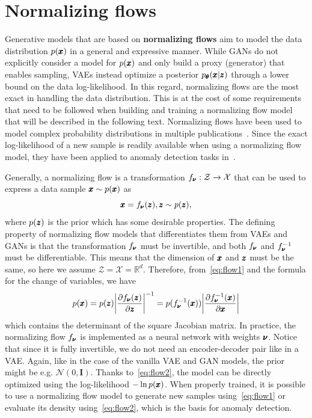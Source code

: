 \section{Normalizing flows} \label{sec:flow_models}
Generative models that are based on \textbf{normalizing flows} aim to model the data distribution $p(\pmb{{x}})$ in a general and expressive manner. While GANs do not explicitly consider a model for $p(\pmb{{x}})$ and only build a proxy (generator) that enables sampling, VAEs instead optimize a posterior $p_{\pmb{{\theta}}}(\pmb{{x}}|\pmb{{z}})$ through a lower bound on the data log-likelihood. In this regard, normalizing flows are the most exact in handling the data distribution. This is at the cost of some requirements that need to be followed when building and training a normalizing flow model that will be described in the following text. Normalizing flows have been used to model complex probability distributions in multiple publications~\cite{dinh2014nice,rezende2015variational,kingma2016improved,jin2022pfvae}. Since the exact log-likelihood of a new sample is readily available when using a normalizing flow model, they have been applied to anomaly detection tasks in~\cite{yamaguchi2019adaflow, schmidtNormalizingFlowsNovelty2019, diasAnomalyDetectionTrajectory2020a, pevny2020sum,rudolph2022fully}.

Generally, a normalizing flow is a transformation $f_{\pmb{{\nu}}}:\mathcal{Z} \rightarrow \mathcal{X}$ that can be used to express a data sample $\pmb{{x}} \sim p(\pmb{{x}})$ as
\begin{equation} \label{eq:flow1}
    \pmb{{x}} = f_{\pmb{{\nu}}}(\pmb{{z}}), \pmb{{z}} \sim p(\pmb{{z}}),
\end{equation}
where $p(\pmb{{z}})$ is the prior which has some desirable properties. The defining property of normalizing flow models that differentiates them from VAEs and GANs is that the transformation $f_{\pmb{{\nu}}}$ must be invertible, and both $f_{\pmb{{\nu}}}$ and $f_{\pmb{{\nu}}}^{-1}$ must be differentiable. This means that the dimension of $\pmb{{x}}$ and $\pmb{{z}}$ must be the same, so here we assume $\mathcal{Z} = \mathcal{X} = \mathbb{R}^d$. Therefore, from~\eqref{eq:flow1} and the formula for the change of variables, we have
\begin{equation} \label{eq:flow2}
    p(\vc{x}) = p(\vc{z}) \left\vert \frac{\partial f_{\vc{\nu}}(\vc{z})}{\partial \vc{z}} \right\vert ^{-1} = p(f^{-1}_{\vc{\nu}}(\vc{x})) \left\vert \frac{\partial f^{-1}_{\vc{\nu}}(\vc{x})}{\partial \vc{x}} \right\vert 
\end{equation}
which contains the determinant of the square Jacobian matrix. In practice, the normalizing flow $f_{\pmb{{\nu}}}$ is implemented as a neural network with weights $\pmb{{\nu}}$. Notice that since it is fully invertible, we do not need an encoder-decoder pair like in a VAE. Again, like in the case of the vanilla VAE and GAN models, the prior might be e.g. $\mathcal{N}(0,\textbf{I})$. Thanks to~\eqref{eq:flow2}, the model can be directly optimized using the log-likelihood $- \ln p(\pmb{{x}})$. When properly trained, it is possible to use a normalizing flow model to generate new samples using~\eqref{eq:flow1} or evaluate its density using~\eqref{eq:flow2}, which is the basis for anomaly detection.

